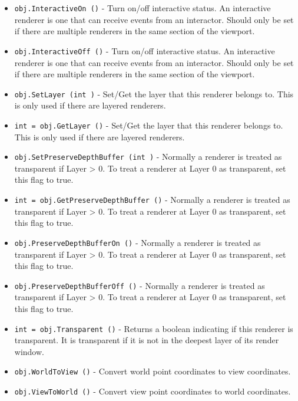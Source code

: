 \begin{itemize}
\item  \verb|obj.InteractiveOn ()| -  Turn on/off interactive status.  An interactive renderer is one that
 can receive events from an interactor.  Should only be set if
 there are multiple renderers in the same section of the viewport.

\item  \verb|obj.InteractiveOff ()| -  Turn on/off interactive status.  An interactive renderer is one that
 can receive events from an interactor.  Should only be set if
 there are multiple renderers in the same section of the viewport.

\item  \verb|obj.SetLayer (int )| -  Set/Get the layer that this renderer belongs to.  This is only used if
 there are layered renderers.

\item  \verb|int = obj.GetLayer ()| -  Set/Get the layer that this renderer belongs to.  This is only used if
 there are layered renderers.

\item  \verb|obj.SetPreserveDepthBuffer (int )| -  Normally a renderer is treated as transparent if Layer > 0. To treat a
 renderer at Layer 0 as transparent, set this flag to true.

\item  \verb|int = obj.GetPreserveDepthBuffer ()| -  Normally a renderer is treated as transparent if Layer > 0. To treat a
 renderer at Layer 0 as transparent, set this flag to true.

\item  \verb|obj.PreserveDepthBufferOn ()| -  Normally a renderer is treated as transparent if Layer > 0. To treat a
 renderer at Layer 0 as transparent, set this flag to true.

\item  \verb|obj.PreserveDepthBufferOff ()| -  Normally a renderer is treated as transparent if Layer > 0. To treat a
 renderer at Layer 0 as transparent, set this flag to true.

\item  \verb|int = obj.Transparent ()| -  Returns a boolean indicating if this renderer is transparent.  It is
 transparent if it is not in the deepest layer of its render window.

\item  \verb|obj.WorldToView ()| -  Convert world point coordinates to view coordinates.

\item  \verb|obj.ViewToWorld ()| -  Convert view point coordinates to world coordinates.


\end{itemize}
